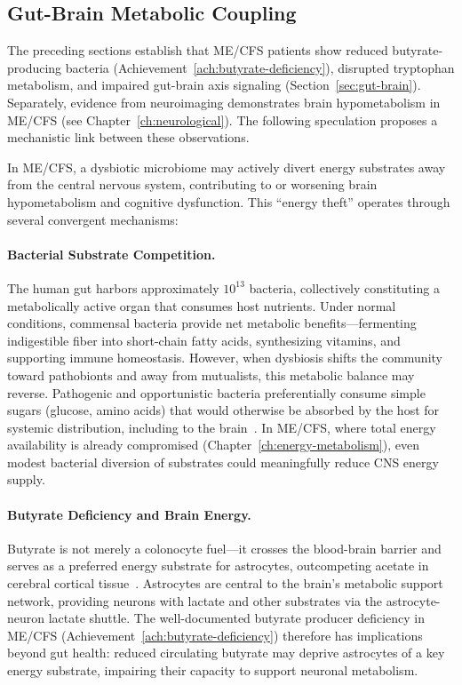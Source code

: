 \subsection{Gut-Brain Metabolic Coupling}
\label{sec:gut-brain-metabolic}

The preceding sections establish that ME/CFS patients show reduced butyrate-producing bacteria (Achievement~\ref{ach:butyrate-deficiency}), disrupted tryptophan metabolism, and impaired gut-brain axis signaling (Section~\ref{sec:gut-brain}). Separately, evidence from neuroimaging demonstrates brain hypometabolism in ME/CFS (see Chapter~\ref{ch:neurological}). The following speculation proposes a mechanistic link between these observations.

\begin{speculation}
\label{spec:gut-brain-energy-theft}
In ME/CFS, a dysbiotic microbiome may actively divert energy substrates away from the central nervous system, contributing to or worsening brain hypometabolism and cognitive dysfunction. This ``energy theft'' operates through several convergent mechanisms:

\paragraph{Bacterial Substrate Competition.}
The human gut harbors approximately $10^{13}$ bacteria, collectively constituting a metabolically active organ that consumes host nutrients. Under normal conditions, commensal bacteria provide net metabolic benefits---fermenting indigestible fiber into short-chain fatty acids, synthesizing vitamins, and supporting immune homeostasis. However, when dysbiosis shifts the community toward pathobionts and away from mutualists, this metabolic balance may reverse. Pathogenic and opportunistic bacteria preferentially consume simple sugars (glucose, amino acids) that would otherwise be absorbed by the host for systemic distribution, including to the brain~\cite{Guo2025nutrient}. In ME/CFS, where total energy availability is already compromised (Chapter~\ref{ch:energy-metabolism}), even modest bacterial diversion of substrates could meaningfully reduce CNS energy supply.

\paragraph{Butyrate Deficiency and Brain Energy.}
Butyrate is not merely a colonocyte fuel---it crosses the blood-brain barrier and serves as a preferred energy substrate for astrocytes, outcompeting acetate in cerebral cortical tissue~\cite{Ameen2024butyrate}. Astrocytes are central to the brain's metabolic support network, providing neurons with lactate and other substrates via the astrocyte-neuron lactate shuttle. The well-documented butyrate producer deficiency in ME/CFS (Achievement~\ref{ach:butyrate-deficiency}) therefore has implications beyond gut health: reduced circulating butyrate may deprive astrocytes of a key energy substrate, impairing their capacity to support neuronal metabolism.


\end{speculation}
